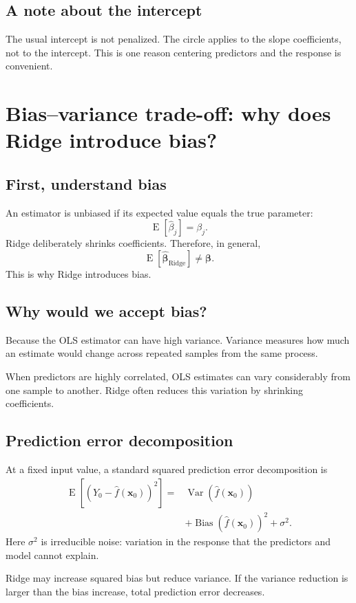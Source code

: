 \documentclass[11pt,a4paper,oneside]{book}
\theoremstyle{remark}
\newcommand{\bta}{\boldsymbol{\beta}}
\newcommand{\Var}{\operatorname{Var}}
\newcommand{\E}{\operatorname{E}}
\begin{document}
\section{A note about the intercept}
The usual intercept is not penalized. The circle applies to the slope
coefficients, not to the intercept. This is one reason centering predictors
and the response is convenient.

\chapter{Bias--variance trade-off: why does Ridge introduce bias?}

\section{First, understand bias}
An estimator is unbiased if its expected value equals the true parameter:
\[
\E[\widehat\beta_j]=\beta_j.
\]
Ridge deliberately shrinks coefficients. Therefore, in general,
\[
\E[\widehat{\bta}_{\mathrm{Ridge}}]\neq\bta.
\]
This is why Ridge introduces bias.

\section{Why would we accept bias?}
Because the OLS estimator can have high variance. Variance measures how much
an estimate would change across repeated samples from the same process.

When predictors are highly correlated, OLS estimates can vary considerably
from one sample to another. Ridge often reduces this variation by shrinking
coefficients.

\section{Prediction error decomposition}
At a fixed input value, a standard squared prediction error decomposition is
\[
\begin{aligned}
\E[(Y_0-\widehat f(\mathbf x_0))^2]
={}&\Var(\widehat f(\mathbf x_0))\\
&+\operatorname{Bias}(\widehat f(\mathbf x_0))^2+\sigma^2.
\end{aligned}
\]
Here $\sigma^2$ is irreducible noise: variation in the response that the
predictors and model cannot explain.

Ridge may increase squared bias but reduce variance. If the variance
reduction is larger than the bias increase, total prediction error decreases.
\end{document}
